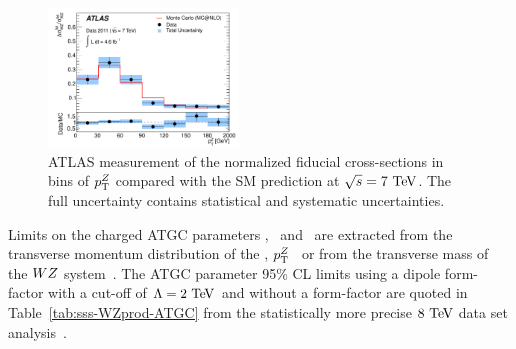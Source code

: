 \begin{figure}[htbp]
  \begin{center}
  \includegraphics[width=0.45\textwidth]{figures/sss-inclboson-diboson-wzprod-ptZ.pdf}
  \caption{ATLAS measurement of the normalized fiducial cross-sections in bins of $p_{\mathrm{T}}^Z$ compared with the SM prediction at $\rts = 7\TeV$. The full uncertainty contains statistical and systematic uncertainties.}
\label{fig:sss-WZprod-ptZ-det}
\end{center}
\end{figure}


Limits on the charged ATGC parameters \dkz, \lz\ and \gz\ are extracted from the transverse momentum distribution
of the \Zboson, $p_{\mathrm{T}}^Z$~\cite{Aad:2012twa} or from the transverse mass of the $WZ$ system~\cite{Aad:2016ett}. 
The ATGC parameter 95\% CL limits using a dipole form-factor with a cut-off of $\Lambda=2\TeV$ and without a form-factor are quoted 
in Table~\ref{tab:sss-WZprod-ATGC} from the statistically more precise $8\TeV$ data set analysis~\cite{Aad:2016ett}.



